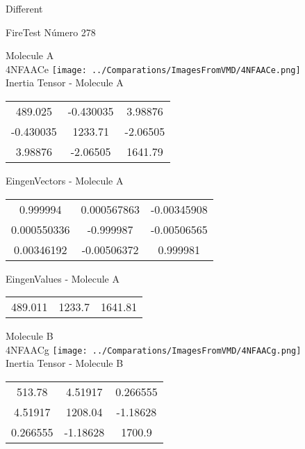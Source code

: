 \begin{center}
\vtab
\vtab
\textcolor{NavyBlue}{\Large Different}
\end{center}

 \newpage

\vtab[-2cm]
\begin{center}
{\large FireTest \tab Número 278}
\end{center}
\begin{multicols}{2}
\begin{center}

Molecule A \\ 
4NFAACe
\texttt{[image: ../Comparations/ImagesFromVMD/4NFAACe.png]}
\\
Inertia Tensor - Molecule A \\
\vtab

\begin{tabular}{|c c c|}
489.025	 & 	-0.430035	 & 	3.98876	 \\
-0.430035	 & 	1233.71	 & 	-2.06505	 \\
3.98876	 & 	-2.06505	 & 	1641.79
\end{tabular}

\vtab
 EingenVectors - Molecule A     \\
\vtab
\begin{tabular}{|c c c|}
0.999994	 & 	0.000567863	 & 	-0.00345908	 \\
0.000550336	 & 	-0.999987	 & 	-0.00506565	 \\
0.00346192	 & 	-0.00506372	 & 	0.999981
\end{tabular}

\vtab
 EingenValues - Molecule A     \\
\vtab
\begin{tabular}{|c c c|}
489.011	 & 	1233.7	 & 	1641.81	 \\
\end{tabular}
\columnbreak

Molecule B \\ 
4NFAACg
\texttt{[image: ../Comparations/ImagesFromVMD/4NFAACg.png]}
\\
Inertia Tensor - Molecule B \\
\vtab

\begin{tabular}{|c c c|}
513.78	 & 	4.51917	 & 	0.266555	 \\
4.51917	 & 	1208.04	 & 	-1.18628	 \\
0.266555	 & 	-1.18628	 & 	1700.9
\end{tabular}


\end{center}
\end{multicols}
